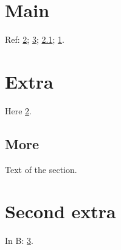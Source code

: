 \documentclass{amsbook}
\begin{document}
\chapter{Main}\label{main}
Ref: \ref{app:a}; \ref{app:b}; \ref{sec:a}; \ref{main}.
\appendix
\chapter{Extra}\label{app:a}
Here \ref{app:a}.
\section{More}\label{sec:a}
Text of the section.
\chapter{Second extra}\label{app:b}
In B: \ref{app:b}.
\end{document}

